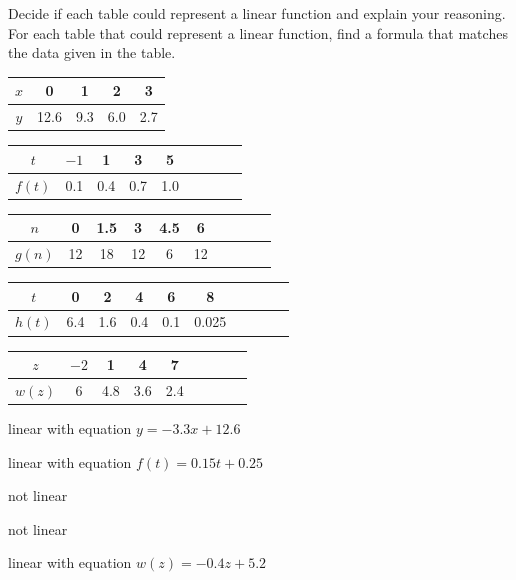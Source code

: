 \exheader

\begin{exercise}
Decide if each table could represent a linear function and explain your reasoning.  For each table that could represent a linear function, find a formula that matches the data given in the table.

\begin{parts}
    \item
\begin{tabular}{|c|c|c|c|c|}
\hline $x$&0&1&2&3
\\\hline $y$&12.6&9.3&6.0&2.7
\\\hline
\end{tabular}

\item \begin{tabular}{|c|c|c|c|c|c|cc c|}
\hline $t$ & $-1$ & 1 & 3 & 5 
\\\hline $f(t)$ & 0.1 & 0.4 & 0.7 & 1.0 
\\\hline
\end{tabular}

\item \begin{tabular}{|c|c|c|c|c|c|c|cc c|}
\hline $n$ & 0 & 1.5 & 3 & 4.5 & 6 
\\\hline $g(n)$ & 12 & 18 & 12& 6& 12
\\\hline
\end{tabular}

\item \begin{tabular}{|c|c|c|c|c|c|c|cc c|}
\hline $t$ & 0 & 2 & 4 & 6 & 8 
\\\hline $h(t)$ & 6.4 & 1.6 & 0.4& 0.1& 0.025
\\\hline
\end{tabular}

\item \begin{tabular}{|c|c|c|c|c|c|cc c|}
\hline $z$ & $-2$ & 1 & 4 & 7 
\\\hline $w(z)$ & 6 & 4.8 & 3.6 & 2.4 
\\\hline
\end{tabular}
\end{parts}

\end{exercise}

\begin{solution}
    \begin{parts}
        \item linear with equation $y=-3.3x+12.6$
        \item linear with equation $f(t)=0.15t+0.25$
        \item not linear
        \item not linear
        \item linear with equation $w(z)=-0.4z+5.2$
    \end{parts}
\end{solution}



